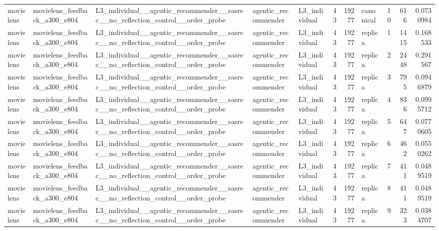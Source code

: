\begin{table}[htbp!]
\begin{tabular}{lllllrrlrrr}
movielens & movielens\_feedback\_a300\_e804 & L3\_individual\_\_agentic\_recommender\_\_sasrec\_\_no\_reflection\_control\_\_order\_probe & agentic\_recommender & L3\_individual & 43 & 19277 & canonical & 10 & 616 & 0.0730984 \\
movielens & movielens\_feedback\_a300\_e804 & L3\_individual\_\_agentic\_recommender\_\_sasrec\_\_no\_reflection\_control\_\_order\_probe & agentic\_recommender & L3\_individual & 43 & 19277 & replica & 1 & 1415 & 0.168533 \\
movielens & movielens\_feedback\_a300\_e804 & L3\_individual\_\_agentic\_recommender\_\_sasrec\_\_no\_reflection\_control\_\_order\_probe & agentic\_recommender & L3\_individual & 43 & 19277 & replica & 2 & 2448 & 0.291567 \\
movielens & movielens\_feedback\_a300\_e804 & L3\_individual\_\_agentic\_recommender\_\_sasrec\_\_no\_reflection\_control\_\_order\_probe & agentic\_recommender & L3\_individual & 43 & 19277 & replica & 3 & 795 & 0.0946879 \\
movielens & movielens\_feedback\_a300\_e804 & L3\_individual\_\_agentic\_recommender\_\_sasrec\_\_no\_reflection\_control\_\_order\_probe & agentic\_recommender & L3\_individual & 43 & 19277 & replica & 4 & 836 & 0.0995712 \\
movielens & movielens\_feedback\_a300\_e804 & L3\_individual\_\_agentic\_recommender\_\_sasrec\_\_no\_reflection\_control\_\_order\_probe & agentic\_recommender & L3\_individual & 43 & 19277 & replica & 5 & 647 & 0.0770605 \\
movielens & movielens\_feedback\_a300\_e804 & L3\_individual\_\_agentic\_recommender\_\_sasrec\_\_no\_reflection\_control\_\_order\_probe & agentic\_recommender & L3\_individual & 43 & 19277 & replica & 6 & 462 & 0.0550262 \\
movielens & movielens\_feedback\_a300\_e804 & L3\_individual\_\_agentic\_recommender\_\_sasrec\_\_no\_reflection\_control\_\_order\_probe & agentic\_recommender & L3\_individual & 43 & 19277 & replica & 7 & 411 & 0.0489519 \\
movielens & movielens\_feedback\_a300\_e804 & L3\_individual\_\_agentic\_recommender\_\_sasrec\_\_no\_reflection\_control\_\_order\_probe & agentic\_recommender & L3\_individual & 43 & 19277 & replica & 8 & 411 & 0.0489519 \\
movielens & movielens\_feedback\_a300\_e804 & L3\_individual\_\_agentic\_recommender\_\_sasrec\_\_no\_reflection\_control\_\_order\_probe & agentic\_recommender & L3\_individual & 43 & 19277 & replica & 9 & 323 & 0.0384707 \\

\end{tabular}
\end{table}
